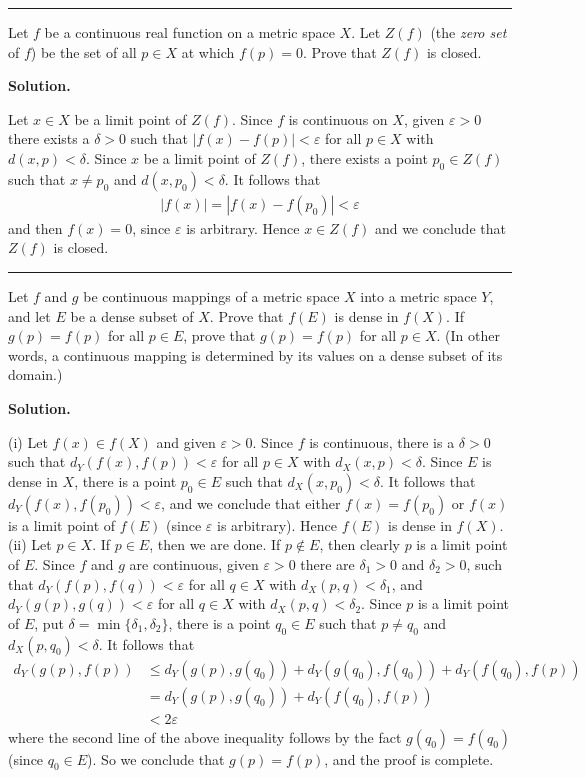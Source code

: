 \documentclass[12pt]{article}
\theoremstyle{definition}
\begin{document}
\bigskip\noindent\hrule\bigskip

Let $f$ be a continuous real function on a metric space $X$. Let $Z(f)$ (the \textit{zero set} of $f$) be the set of all $p\in X$ at which $f(p)=0$. Prove that $Z(f)$ is closed.

\smallskip
\noindent\textbf{Solution.}\quad

Let $x\in X$ be a limit point of $Z(f)$. Since $f$ is continuous on $X$, given $\varepsilon>0$ there exists a $\delta>0$ such that $\left\vert f(x)-f(p)\right\vert<\varepsilon$ for all $p\in X$ with $d(x,p)<\delta$. Since $x$ be a limit point of $Z(f)$, there exists a point $p_0\in Z(f)$ such that $x\ne p_0$ and $d(x,p_0)<\delta$. It follows that
\begin{align*}
\left\vert f(x)\right\vert
=\left\vert f(x)-f(p_0)\right\vert
<\varepsilon
\end{align*}
and then $f(x)=0$, since $\varepsilon$ is arbitrary. Hence $x\in Z(f)$ and we conclude that $Z(f)$ is closed.



\bigskip\noindent\hrule\bigskip

Let $f$ and $g$ be continuous mappings of a metric space $X$ into a metric space $Y$, and let $E$ be a dense subset of $X$. Prove that $f(E)$ is dense in $f(X)$. If $g(p)=f(p)$ for all $p\in E$, prove that $g(p)=f(p)$ for all $p\in X$. (In other words, a continuous mapping is determined by its values on a dense subset of its domain.)

\smallskip
\noindent\textbf{Solution.}\quad

(i) Let $f(x)\in f(X)$ and given $\varepsilon>0$. Since $f$ is continuous, there is a $\delta>0$ such that $d_Y(f(x),f(p))<\varepsilon$ for all $p\in X$ with $d_X(x,p)<\delta$. Since $E$ is dense in $X$, there is a point $p_0\in E$ such that $d_X(x,p_0)<\delta$. It follows that $d_Y(f(x),f(p_0))<\varepsilon$, and we conclude that either $f(x)=f(p_0)$ or $f(x)$ is a limit point of $f(E)$ (since $\varepsilon$ is arbitrary). Hence $f(E)$ is dense in $f(X)$.
(ii) Let $p\in X$. If $p\in E$, then we are done. If $p\notin E$, then clearly $p$ is a limit point of $E$. Since $f$ and $g$ are continuous, given $\varepsilon>0$ there are $\delta_1>0$ and $\delta_2>0$, such that $d_Y(f(p),f(q))<\varepsilon$ for all $q\in X$ with $d_X(p,q)<\delta_1$, and $d_Y(g(p),g(q))<\varepsilon$ for all $q\in X$ with $d_X(p,q)<\delta_2$. Since $p$ is a limit point of $E$, put $\delta=\min\{\delta_1,\delta_2\}$, there is a point $q_0\in E$ such that $p\ne q_0$ and $d_X(p,q_0)<\delta$. It follows that
\begin{align*}
d_Y(g(p),f(p))
&\le d_Y(g(p),g(q_0))+d_Y(g(q_0),f(q_0))+d_Y(f(q_0),f(p)) \\
&= d_Y(g(p),g(q_0))+d_Y(f(q_0),f(p)) \\
&<2\varepsilon
\end{align*}
where the second line of the above inequality follows by the fact $g(q_0)=f(q_0)$ (since $q_0\in E$). So we conclude that $g(p)=f(p)$, and the proof is complete.
\end{document}
